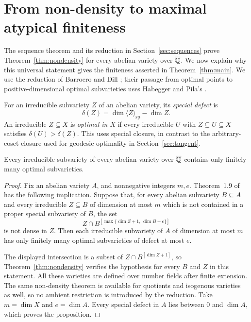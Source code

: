 \section{From non-density to maximal atypical finiteness}\label{sec:finiteness}

The sequence theorem and its reduction in Section~\ref{sec:sequences}
prove Theorem~\ref{thm:nondensity} for every abelian variety over $\overline{\mathbb Q}$.
We now explain why this universal statement gives the finiteness
asserted in Theorem~\ref{thm:main}. We use the reduction of Barroero
and Dill \cite[Theorem~1.9]{BarroeroDill2021}; their passage from
optimal points to positive-dimensional optimal subvarieties uses
Habegger and Pila's \cite[Theorem~9.8(i)]{HabeggerPila2016}.

For an irreducible subvariety $Z$ of an abelian variety, its
\emph{special defect} is
\[
 \delta(Z)=\dim\langle Z\rangle_{\mathrm{sp}}-\dim Z.
\]
An irreducible $Z\subseteq X$ is \emph{optimal in $X$} if every
irreducible $U$ with $Z\subsetneq U\subseteq X$ satisfies
$\delta(U)>\delta(Z)$. This uses special closure, in contrast to the
arbitrary-coset closure used for geodesic optimality in
Section~\ref{sec:tangent}.

\begin{proposition}\label{prop:optimal-finite}
Every irreducible subvariety of every abelian variety over $\overline{\mathbb Q}$
contains only finitely many optimal subvarieties.
\end{proposition}

\begin{proof}
Fix an abelian variety $A$, and nonnegative integers $m,e$.
Theorem~1.9 of \citet{BarroeroDill2021} has the following implication.
Suppose that, for every abelian subvariety $B\subseteq A$ and every
irreducible $Z\subseteq B$ of dimension at most $m$ which is not
contained in a proper special subvariety of $B$, the set
\[
 Z\cap B^{[\max\{\dim Z+1,\,\dim B-e\}]}
\]
is not dense in $Z$. Then each irreducible subvariety of $A$ of
dimension at most $m$ has only finitely many optimal subvarieties of
defect at most $e$.

The displayed intersection is a subset of
$Z\cap B^{[\dim Z+1]}$, so Theorem~\ref{thm:nondensity} verifies the
hypothesis for every $B$ and $Z$ in this statement. All these varieties
are defined over number fields after finite extension. The same
non-density theorem is available for quotients and isogenous varieties
as well, so no ambient restriction is introduced by the reduction.
Take $m=\dim X$ and $e=\dim A$. Every special defect in $A$ lies between
$0$ and $\dim A$, which proves the proposition.
\end{proof}

